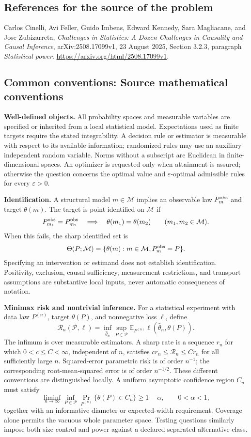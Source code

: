 \documentclass[11pt,a4paper]{article}
\newcommand{\E}{\mathbb E}
\begin{document}
\subsection*{References for the source of the problem}
Carlos Cinelli, Avi Feller, Guido Imbens, Edward Kennedy, Sara Magliacane, and Jose Zubizarreta, \emph{Challenges in Statistics: A Dozen Challenges in Causality and Causal Inference}, arXiv:2508.17099v1, 23 August 2025, Section 3.2.3, paragraph \emph{Statistical power}. \url{https://arxiv.org/html/2508.17099v1}.

\subsection*{Common conventions: Source mathematical conventions}

\textbf{Well-defined objects.}
All probability spaces and measurable variables are specified or inherited
from a local statistical model. Expectations used as finite targets require
the stated integrability. A decision rule or estimator is measurable with
respect to its available information; randomized rules may use an auxiliary
independent random variable. Norms without a subscript are Euclidean in
finite-dimensional spaces. An optimizer is requested only when attainment
is assured; otherwise the question concerns the optimal value and
$\varepsilon$-optimal admissible rules for every $\varepsilon>0$.

\textbf{Identification.}
A structural model $m\in\mathcal M$ implies an observable law
$P_m^{\rm obs}$ and target $\theta(m)$. The target is point identified on
$\mathcal M$ if
\[
 P_{m_1}^{\rm obs}=P_{m_2}^{\rm obs}
 \quad\Longrightarrow\quad\theta(m_1)=\theta(m_2)
 \qquad(m_1,m_2\in\mathcal M).
\]
When this fails, the sharp identified set is
\[
 \Theta(P;\mathcal M)=\{\theta(m):m\in\mathcal M,
                                  P_m^{\rm obs}=P\}.
\]
Specifying an intervention or estimand does not establish identification.
Positivity, exclusion, causal sufficiency, measurement restrictions, and
transport assumptions are substantive local inputs, never automatic
consequences of notation.

\textbf{Minimax risk and nontrivial inference.}
For a statistical experiment with data law $P^{(n)}$, target $\theta(P)$,
and nonnegative loss $\ell$, define
\[
 \mathcal R_n(\mathcal P,\ell)
   =\inf_{\widehat\theta_n}\sup_{P\in\mathcal P}
      \E_{P^{(n)}}\ell(\widehat\theta_n,\theta(P)).
\]
The infimum is over measurable estimators. A sharp rate is a sequence
$r_n$ for which $0<c\leq C<\infty$, independent of $n$, satisfies
$c r_n\leq\mathcal R_n\leq C r_n$ for all sufficiently large $n$.
Squared-error parametric risk is of order $n^{-1}$; the corresponding
root-mean-squared error is of order $n^{-1/2}$. These different conventions
are distinguished locally. A uniform asymptotic confidence region $C_n$
must satisfy
\[
 \liminf_{n\to\infty}\inf_{P\in\mathcal P}
     \Pr_{P^{(n)}}\{\theta(P)\in C_n\}\geq 1-\alpha,
 \qquad 0<\alpha<1,
\]
together with an informative diameter or expected-width requirement.
Coverage alone permits the vacuous whole parameter space. Testing questions
similarly impose both size control and power against a declared separated
alternative class.
\end{document}
